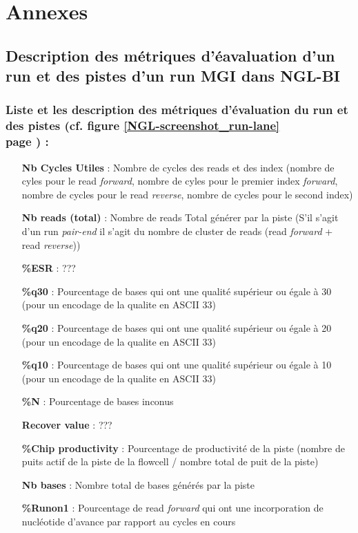 \section{Annexes}
\subsection*{Description des métriques d'éavaluation d'un run et des pistes d'un run MGI dans NGL-BI}
\label{anexes1}
\subsubsection*{Liste et les description des métriques d'évaluation du run et des pistes (cf. figure \ref{NGL-screenshot_run-lane} \\page \pageref{NGL-screenshot_run-lane}) :}
\begin{itemize}
    \item[\textbf{Nb Cycles Utiles} :] Nombre de cycles des reads et des index (nombre de cyles pour le read \emph{forward}, nombre de cyles pour le premier index  \emph{forward}, nombre de cycles pour le read \emph{reverse}, nombre de cycles pour le second index)
    \item[\textbf{Nb reads (total)} :] Nombre de reads Total générer par la piste (S'il s'agit d'un run \emph{pair-end} il s'agit du nombre de cluster de reads (read \emph{forward} + read \emph{reverse}))
    \item[\textbf{\%ESR} :] ???
    \item[\textbf{\%q30} :] Pourcentage de bases qui ont une qualité supérieur ou égale à 30 (pour un encodage de la qualite en ASCII 33)
    \item[\textbf{\%q20} :] Pourcentage de bases qui ont une qualité supérieur ou égale à 20 (pour un encodage de la qualite en ASCII 33)
    \item[\textbf{\%q10} :] Pourcentage de bases qui ont une qualité supérieur ou égale à 10 (pour un encodage de la qualite en ASCII 33)
    \item[\textbf{\%N} :] Pourcentage de bases inconus
    \item[\textbf{Recover value} :] ???
    \item[\textbf{\%Chip productivity} :] Pourcentage de productivité de la piste (nombre de puits actif de la piste de la flowcell / nombre total de puit de la piste)
    \item[\textbf{Nb bases} :] Nombre total de bases générés par la piste
    \item[\textbf{\%Runon1} :] Pourcentage de read \emph{forward} qui ont une incorporation de nucléotide d'avance par rapport au cycles en cours

\end{itemize}
